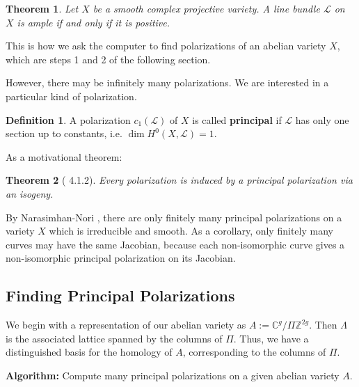 \documentclass[12pt,reqno]{amsart}
\newcommand{\C}{\mathbb{C}}
\newcommand{\Z}{\mathbb{Z}}
\newcommand{\mc}{\mathcal}
\newtheorem*{thm*}{Theorem}
\theoremstyle{definition}
\newtheorem{defn}{Definition}
\theoremstyle{remark}
\begin{document}
\begin{thm*} 
Let $X$ be a smooth complex projective variety. A line bundle $\mc{L}$ on $X$ is ample if and only if it is positive.
\end{thm*}


This is how we ask the computer to find polarizations of an abelian variety $X$, which are steps 1 and 2 of the following section.

However, there may be infinitely many polarizations. We are interested in a particular kind of polarization.

\begin{defn}  A polarization $c_1(\mc{L})$ of $X$ is called \textbf{principal} if $\mc{L}$ has only one section up to constants, i.e. $\dim H^0(X, \mc{L}) = 1$.  \end{defn} 

As a motivational theorem:

\begin{thm*} [\cite{bl} 4.1.2] Every polarization is induced by a principal polarization via an isogeny. \end{thm*}

By Narasimhan-Nori \cite{nn}, there are only finitely many principal polarizations on a variety $X$ which is irreducible and smooth. As a corollary, only finitely many curves may have the same Jacobian, because each non-isomorphic curve gives a non-isomorphic principal polarization on its Jacobian.


\subsection{Finding Principal Polarizations} 
\label{sec:find}
We begin with a representation of our abelian variety as $A := \C^g/\Pi\Z^{2g}$. Then $\Lambda$ is the associated lattice spanned by the columns of $\Pi$. Thus, we have a distinguished basis for the homology of $A$, corresponding to the columns of $\Pi$. 

\vspace{+5pt}

\textbf{Algorithm:} Compute many principal polarizations on a given abelian variety $A$.
\end{document}
